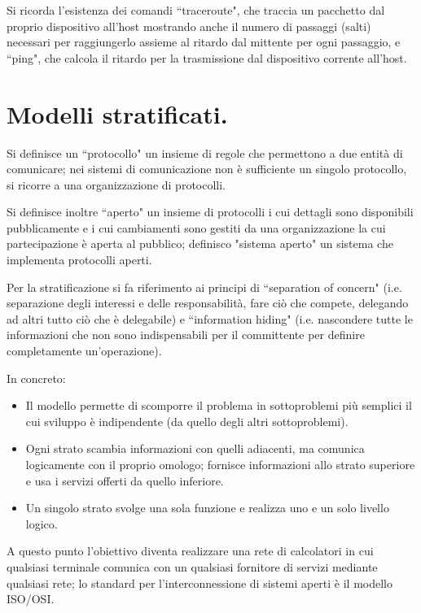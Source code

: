 \documentclass[11pt, italian, openany]{book}
\begin{document}
\begin{sloppypar}
Si ricorda l'esistenza dei comandi ``traceroute", che traccia un pacchetto dal proprio dispositivo all'host mostrando anche il numero di passaggi
(salti) necessari per raggiungerlo assieme al ritardo dal mittente per ogni passaggio, e ``ping", che calcola il ritardo per la trasmissione dal
dispositivo corrente all'host.

\section{Modelli stratificati.}
Si definisce un ``protocollo" un insieme di regole che permettono a due entit\`a di comunicare; nei sistemi di comunicazione non \`e
sufficiente un singolo protocollo, si ricorre a una organizzazione di protocolli.

Si definisce inoltre ``aperto" un insieme di protocolli i cui dettagli sono disponibili pubblicamente e i cui cambiamenti sono gestiti da una
organizzazione la cui partecipazione \`e aperta al pubblico; definisco "sistema aperto" un sistema che implementa protocolli aperti.

Per la stratificazione si fa riferimento ai principi di ``separation of concern" (i.e. separazione degli interessi e delle responsabilit\`a, fare
ci\`o che compete, delegando ad altri tutto ci\`o che \`e delegabile) e ``information hiding" (i.e. nascondere tutte le informazioni che non sono
indispensabili per il committente per definire completamente un'operazione).

In concreto:
\begin{itemize}[topsep=0pt, itemsep=0pt, parsep=0pt]
	\item Il modello permette di scomporre il problema in sottoproblemi pi\`u semplici il cui sviluppo \`e indipendente (da quello degli altri
	sottoproblemi).
	\item Ogni strato scambia informazioni con quelli adiacenti, ma comunica logicamente con il proprio omologo; fornisce informazioni allo strato
	superiore e usa i servizi offerti da quello inferiore.
	\item Un singolo strato svolge una sola funzione e realizza uno e un solo livello logico.
\end{itemize}

A questo punto l'obiettivo diventa realizzare una rete di calcolatori in cui qualsiasi terminale comunica con un qualsiasi fornitore di servizi
mediante qualsiasi rete; lo standard per l'interconnessione di sistemi aperti \`e il modello ISO/OSI.


\end{sloppypar}
\end{document}
